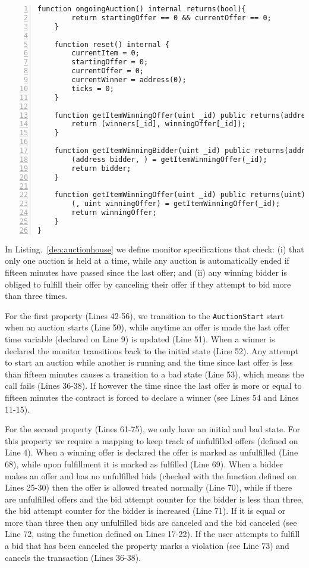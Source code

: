 \documentclass{article}
\begin{document}
\begin{lstlisting}[language=DEA,basicstyle=\scriptsize,numbers=left,numbersep=2pt,xleftmargin=0.3cm,escapechar=\%,label={lt:auctionhouse}]
    function ongoingAuction() internal returns(bool){
        return startingOffer == 0 && currentOffer == 0;
    }

    function reset() internal {
        currentItem = 0;
        startingOffer = 0;
        currentOffer = 0;
        currentWinner = address(0);
        ticks = 0;
    }

    function getItemWinningOffer(uint _id) public returns(address,uint){
        return (winners[_id], winningOffer[_id]);
    }

    function getItemWinningBidder(uint _id) public returns(address){
        (address bidder, ) = getItemWinningOffer(_id);
        return bidder;
    }

    function getItemWinningOffer(uint _id) public returns(uint){
        (, uint winningOffer) = getItemWinningOffer(_id);
        return winningOffer;
    }
}
\end{lstlisting}\normalsize

In Listing.~\ref{dea:auctionhouse} we define monitor specifications that check: (i) that only one auction is held at a time, while any auction is automatically ended if fifteen minutes have passed since the last offer; and (ii) any winning bidder is obliged to fulfill their offer by canceling their offer if they attempt to bid more than three times.

For the first property (Lines 42-56), we transition to the \texttt{AuctionStart} start when an auction starts (Line 50), while anytime an offer is made the last offer time variable (declared on Line 9) is updated (Line 51). When a winner is declared the monitor transitions back to the initial state (Line 52). Any attempt to start an auction while another is running and the time since last offer is less than fifteen minutes causes a transition to a bad state (Line 53), which means the call fails (Lines 36-38). If however the time since the last offer is more or equal to fifteen minutes the contract is forced to declare a winner (see Lines 54 and Lines 11-15).

For the second property (Lines 61-75), we only have an initial and bad state. For this property we require a mapping to keep track of unfulfilled offers (defined on Line 4). When a winning offer is declared the offer is marked as unfulfilled (Line 68), while upon fulfillment it is marked as fulfilled (Line 69). When a bidder makes an offer and has no unfulfilled bids (checked with the function defined on Lines 25-30) then the offer is allowed treated normally (Line 70), while if there are unfulfilled offers and the bid attempt counter for the bidder is less than three, the bid attempt counter for the bidder is increased (Line 71). If it is equal or more than three then any unfulfilled bids are canceled and the bid canceled (see Line 72, using the function defined on Lines 17-22). If the user attempts to fulfill a bid that has been canceled the property marks a violation (see Line 73) and cancels the transaction (Lines 36-38).
 
\end{document}
